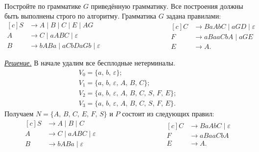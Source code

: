 \documentclass[10pt]{article}
\newcounter{pr} \setcounter{pr}{0}
\newenvironment{sol}
  {\par
   {\itshape \underline{Решение.}}}
  {}
\newcommand{\eps}{\varepsilon}
\begin{document}
  \title{\ptitle}
  \author{\pauthor, \pgroup}
  \date{\pdate}
  \maketitle
  \thispagestyle{fancytitlepage}
  \begin{pr}
    Постройте по грамматике $G$ приведённую грамматику. Все построения должны быть выполнены строго по алгоритму. Грамматика $G$ задана правилами:
    \begin{equation*}
      \begin{aligned}[c]
        S & \to A \mid B \mid C \mid E \mid AG \\
        A & \to C  \mid aABC \mid \eps \\
        B & \to bABa \mid aCbDaGb \mid \eps
      \end{aligned}
      \hspace{4cm}
      \begin{aligned}[c]
        C & \to BaAbC \mid aGD \mid \eps \\
        F & \to aBaaCbA \mid aGE \\
        E & \to A.
      \end{aligned}
    \end{equation*}
    \begin{sol}
      В начале удалим все бесплодные нетерминалы.
      \begin{gather*}
        V_0 = \{ a,\, b,\, \eps \}; \\
        V_1 = \{ a,\, b,\, \eps,\, A,\, B,\, C \}; \\
        V_2 = \{ a,\, b,\, \eps,\, A,\, B,\, C,\, S,\, F,\, E \}; \\
        V_3 = \{ a,\, b,\, \eps,\, A,\, B,\, C,\, S,\, F,\, E \}.
      \end{gather*}
      Получаем $N = \{ A,\, B,\, C,\, E,\, F,\, S \}$ и $P$ состоит из следующих правил:
      \begin{equation*}
        \begin{aligned}[c]
          S & \to A \mid B \mid C \\
          A & \to C  \mid aABC \mid \eps \\
          B & \to bABa \mid \eps
        \end{aligned}
        \hspace{4cm}
        \begin{aligned}[c]
          C & \to BaAbC \mid \eps \\
          F & \to aBaaCbA \\
          E & \to A.
        \end{aligned}
      \end{equation*}


\end{sol}
\end{pr}
\end{document}
